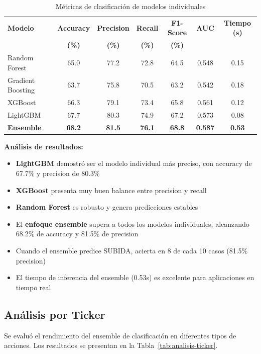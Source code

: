 \documentclass[12pt,a4paper]{report}
\begin{document}
\begin{table}[H]
\centering
\caption{Métricas de clasificación de modelos individuales}
\label{tab:modelos-individuales}
\begin{tabular}{lcccccc}
\toprule
\textbf{Modelo} & \textbf{Accuracy} & \textbf{Precision} & \textbf{Recall} & \textbf{F1-Score} & \textbf{AUC} & \textbf{Tiempo (s)} \\
 & \textbf{(\%)} & \textbf{(\%)} & \textbf{(\%)} & \textbf{(\%)} & & \\
\midrule
Random Forest & 65.0 & 77.2 & 72.8 & 64.5 & 0.548 & 0.15 \\
Gradient Boosting & 63.7 & 75.8 & 70.5 & 63.2 & 0.542 & 0.18 \\
XGBoost & 66.3 & 79.1 & 73.4 & 65.8 & 0.561 & 0.12 \\
LightGBM & 67.7 & 80.3 & 74.9 & 67.2 & 0.573 & 0.08 \\
\midrule
\textbf{Ensemble} & \textbf{68.2} & \textbf{81.5} & \textbf{76.1} & \textbf{68.8} & \textbf{0.587} & \textbf{0.53} \\
\bottomrule
\end{tabular}
\end{table}

\textbf{Análisis de resultados:}

\begin{itemize}
    \item \textbf{LightGBM} demostró ser el modelo individual más preciso, con accuracy de 67.7\% y precision de 80.3\%
    \item \textbf{XGBoost} presenta muy buen balance entre precision y recall
    \item \textbf{Random Forest} es robusto y genera predicciones estables
    \item El \textbf{enfoque ensemble} supera a todos los modelos individuales, alcanzando 68.2\% de accuracy y 81.5\% de precision
    \item Cuando el ensemble predice SUBIDA, acierta en 8 de cada 10 casos (81.5\% precision)
    \item El tiempo de inferencia del ensemble (0.53s) es excelente para aplicaciones en tiempo real
\end{itemize}

\subsection{Análisis por Ticker}

Se evaluó el rendimiento del ensemble de clasificación en diferentes tipos de acciones. Los resultados se presentan en la Tabla~\ref{tab:analisis-ticker}.
\end{document}
